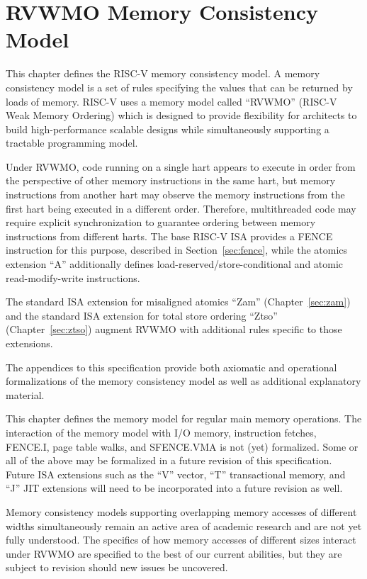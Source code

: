 \chapter{RVWMO Memory Consistency Model}
\label{sec:memorymodel}

This chapter defines the RISC-V memory consistency model.
A memory consistency model is a set of rules specifying the values that can be returned by loads of memory.
RISC-V uses a memory model called ``RVWMO'' (RISC-V Weak Memory Ordering) which is designed to provide flexibility for architects to build high-performance scalable designs while simultaneously supporting a tractable programming model.

Under RVWMO, code running on a single hart appears to execute in order from the perspective of other memory instructions in the same hart, but memory instructions from another hart may observe the memory instructions from the first hart being executed in a different order.
Therefore, multithreaded code may require explicit synchronization to guarantee ordering between memory instructions from different harts.
The base RISC-V ISA provides a FENCE instruction for this purpose, described in Section~\ref{sec:fence}, while the atomics extension ``A'' additionally defines load-reserved/store-conditional and atomic read-modify-write instructions.

The standard ISA extension for misaligned atomics ``Zam'' (Chapter~\ref{sec:zam}) and the standard ISA extension for total store ordering ``Ztso'' (Chapter~\ref{sec:ztso}) augment RVWMO with additional rules specific to those extensions.

The appendices to this specification provide both axiomatic and operational formalizations of the memory consistency model as well as additional explanatory material.

\begin{commentary}
  This chapter defines the memory model for regular main memory operations.  The interaction of the memory model with I/O memory, instruction fetches, FENCE.I, page table walks, and SFENCE.VMA is not (yet) formalized.  Some or all of the above may be formalized in a future revision of this specification.  Future ISA extensions such as the ``V'' vector, ``T'' transactional memory, and ``J'' JIT extensions will need to be incorporated into a future revision as well.

  Memory consistency models supporting overlapping memory accesses of different widths simultaneously remain an active area of academic research and are not yet fully understood.  The specifics of how memory accesses of different sizes interact under RVWMO are specified to the best of our current abilities, but they are subject to revision should new issues be uncovered.
\end{commentary}

